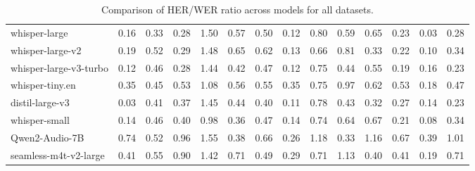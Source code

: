 \begin{table*}[ht!]
{\begin{tabular}{lccccccccccccc}
whisper-large & 0.16 & 0.33 & 0.28 & 1.50 & 0.57 & 0.50 & 0.12 & 0.80 & 0.59 & 0.65 & 0.23 & 0.03 & 0.28 \\ 
whisper-large-v2 & 0.19 & 0.52 & 0.29 & 1.48 & 0.65 & 0.62 & 0.13 & 0.66 & 0.81 & 0.33 & 0.22 & 0.10 & 0.34 \\ 
whisper-large-v3-turbo & 0.12 & 0.46 & 0.28 & 1.44 & 0.42 & 0.47 & 0.12 & 0.75 & 0.44 & 0.55 & 0.19 & 0.16 & 0.23 \\ 
whisper-tiny.en & 0.35 & 0.45 & 0.53 & 1.08 & 0.56 & 0.55 & 0.35 & 0.75 & 0.97 & 0.62 & 0.53 & 0.18 & 0.47 \\ 
distil-large-v3 & 0.03 & 0.41 & 0.37 & 1.45 & 0.44 & 0.40 & 0.11 & 0.78 & 0.43 & 0.32 & 0.27 & 0.14 & 0.23 \\ 
whisper-small & 0.14 & 0.46 & 0.40 & 0.98 & 0.36 & 0.47 & 0.14 & 0.74 & 0.64 & 0.67 & 0.21 & 0.08 & 0.34 \\ 
Qwen2-Audio-7B & 0.74 & 0.52 & 0.96 & 1.55 & 0.38 & 0.66 & 0.26 & 1.18 & 0.33 & 1.16 & 0.67 & 0.39 & 1.01 \\ 
seamless-m4t-v2-large & 0.41 & 0.55 & 0.90 & 1.42 & 0.71 & 0.49 & 0.29 & 0.71 & 1.13 & 0.40 & 0.41 & 0.19 & 0.71 \\ 
\bottomrule
\end{tabular}
}
\caption{Comparison of HER/WER ratio across models for all datasets.}
\label{tab:results_ratio}
\end{table*}
